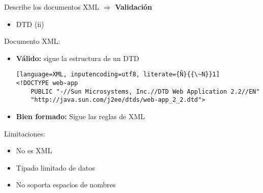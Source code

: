 Describe los documentos XML $\Longrightarrow$ \textbf{Validación}
\begin{itemize}[label=\color{red}\textbullet, leftmargin=*]
	\item \color{lightblue}DTD (ii)
\end{itemize}
Documento XML:
\begin{itemize}
\item \textbf{Válido:} sigue la estructura de un DTD
\begin{lstlisting}[language=XML, inputencoding=utf8, literate={Ñ}{{\~N}}1]
<!DOCTYPE web-app
	PUBLIC "-//Sun Microsystems, Inc.//DTD Web Application 2.2//EN"
	"http://java.sun.com/j2ee/dtds/web-app_2_2.dtd">
\end{lstlisting}
\item \textbf{Bien formado:} Sigue las reglas de XML
\end{itemize}
Limitaciones:
\begin{itemize}
\item No es XML
\item Tipado limitado de datos
\item No soporta espacios de nombres
\end{itemize}

